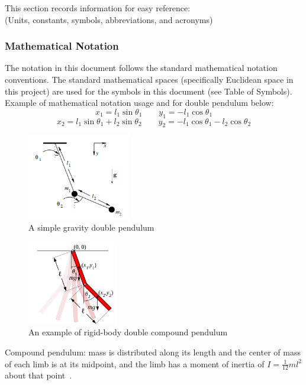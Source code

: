 \documentclass[12pt, titlepage]{article}
\begin{document}
This section records information for easy reference: \\
(Units, constants, symbols, abbreviations, and acronyms)

\subsubsection{Mathematical Notation}

The notation in this document follows the standard mathematical notation
conventions.
The standard mathematical spaces (specifically Euclidean space in this project)
are used for the symbols in this document (see Table of Symbols).
Example of mathematical notation usage and for double pendulum below:
$$x_1 = l_1 \sin\theta_1 \quad\quad y_1 = -l_1 \cos\theta_1$$
$$x_2 = l_1 \sin\theta_1 + l_2 \sin\theta_2 \quad\quad y_2 = -l_1\cos\theta_1
-l_2\cos\theta_2$$

\begin{figure}[!htb]
	\centering
	\includegraphics[width=170px]{doublepend.PNG}
\caption{A simple gravity double pendulum~\citep{SzuminskiOlsztyn2012}}
	\label{fig:doublepend}
\end{figure}

\begin{figure}[!htb]
	\centering
	\includegraphics[width=150px]{Double-pendulum-rigid.png}
	\caption{An example of rigid-body double compound 
	pendulum~\citep{DoublePendulum}}
	\label{fig:multipend}
\end{figure}

Compound pendulum: mass is distributed along its length and the center 
of mass of each limb is at its midpoint, and the limb has a moment of inertia 
of $I = \frac{1}{12}ml^2$ about that point~\cite{DoublePendulum}.
\newpage
\end{document}
